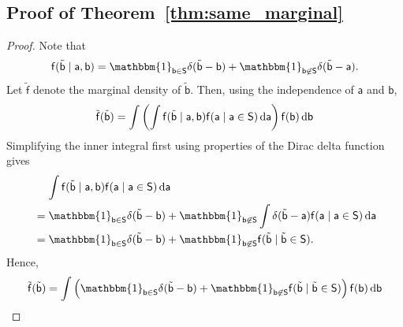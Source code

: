 \subsection{Proof of Theorem~\ref{thm:same_marginal}} \label{sec:proof:same_marginal}
\begin{proof}
    Note that
    \begin{equation}
        \mathsf{f}(\tilde{\mathsf{b}} \mid \mathsf{a}, \mathsf{b})
        = \mathbbm{1}_{\mathsf{b} \in \mathsf{S}} \delta(\tilde{\mathsf{b}} - \mathsf{b})
        + \mathbbm{1}_{\mathsf{b} \not\in \mathsf{S}} \delta(\tilde{\mathsf{b}} - \mathsf{a}).
    \end{equation}
    Let $\tilde{\mathsf{f}}$ denote the marginal density of $\tilde{\mathsf{b}}$.
    Then, using the independence of $\mathsf{a}$ and $\mathsf{b}$,
    \begin{equation}
        \tilde{\mathsf{f}}(\tilde{\mathsf{b}})
        = \int \left( \int \mathsf{f}(\tilde{\mathsf{b}} \mid \mathsf{a}, \mathsf{b}) \mathsf{f}(\mathsf{a} \mid \mathsf{a} \in \mathsf{S}) \mathop{}\!\mathrm{d}{\mathsf{a}} \right) \mathsf{f}(\mathsf{b}) \mathop{}\!\mathrm{d}{\mathsf{b}}
    \end{equation}
    Simplifying the inner integral first using properties of the Dirac delta function gives
    \begin{align}
        &\mathrel{\phantom{=}} \int \mathsf{f}(\tilde{\mathsf{b}} \mid \mathsf{a}, \mathsf{b}) \mathsf{f}(\mathsf{a} \mid \mathsf{a} \in \mathsf{S}) \diff{\mathsf{a}} \\
        &= \mathbbm{1}_{\mathsf{b} \in \mathsf{S}} \delta(\tilde{\mathsf{b}} - \mathsf{b}) + 
        \mathbbm{1}_{\mathsf{b} \not\in \mathsf{S}} \int 
            \delta(\tilde{\mathsf{b}} - \mathsf{a})
            \mathsf{f}(\mathsf{a} \mid \mathsf{a} \in \mathsf{S}) \diff{\mathsf{a}} \\
        &= \mathbbm{1}_{\mathsf{b} \in \mathsf{S}} \delta(\tilde{\mathsf{b}} - \mathsf{b}) + 
        \mathbbm{1}_{\mathsf{b} \not\in \mathsf{S}} \mathsf{f}(\tilde{\mathsf{b}} \mid \tilde{\mathsf{b}} \in \mathsf{S}).
    \end{align}
    Hence,
    \begin{align}
        \tilde{\mathsf{f}}(\tilde{\mathsf{b}})
        &= \int \left(
            \mathbbm{1}_{\mathsf{b} \in \mathsf{S}} \delta(\tilde{\mathsf{b}} - \mathsf{b}) + 
            \mathbbm{1}_{\mathsf{b} \not\in \mathsf{S}} \mathsf{f}(\tilde{\mathsf{b}} \mid \tilde{\mathsf{b}} \in \mathsf{S})
        \right) \mathsf{f}(\mathsf{b}) \diff{\mathsf{b}} \\

\end{align}
\end{proof}

